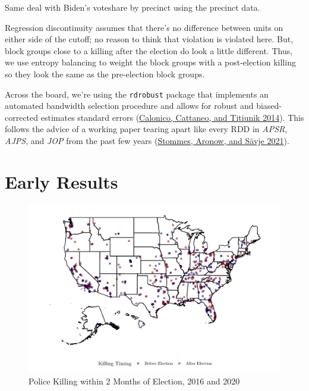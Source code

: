 \documentclass[
  12pt,
]{article}
\begin{document}
Same deal with Biden's voteshare by precinct using the precinct data.

Regression discontinuity assumes that there's no difference between units on either side of the cutoff; no reason to think that violation is violated here. But, block groups close to a killing after the election do look a little different. Thus, we use entropy balancing to weight the block groups with a post-election killing so they look the same as the pre-election block groups.

Across the board, we're using the \texttt{rdrobust} package that implements an automated bandwidth selection procedure and allows for robust and biased-corrected estimates standard errors (\protect\hyperlink{ref-Calonico2014}{Calonico, Cattaneo, and Titiunik 2014}). This follows the advice of a working paper tearing apart like every RDD in \emph{APSR}, \emph{AJPS}, and \emph{JOP} from the past few years (\protect\hyperlink{ref-Stommes2021}{Stommes, Aronow, and Sävje 2021}).

\hypertarget{early-results}{%
\section*{Early Results}\label{early-results}}

\begin{figure}[h]

{\centering \includegraphics{shoot_to_files/figure-latex/map-chunk-1} 

}

\caption{\label{fig:map}Police Killing within 2 Months of Election, 2016 and 2020}\label{fig:map-chunk}
\end{figure}
\end{document}
